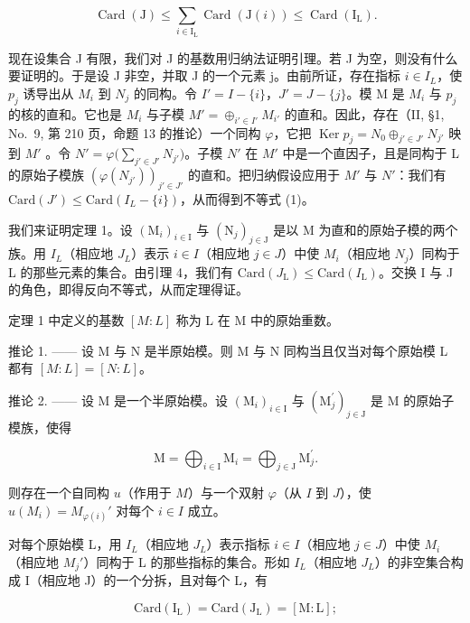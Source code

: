 \[
\operatorname{Card} (\mathrm{J}) \leqslant \sum_ {i \in \mathrm{I} _ {\mathrm{L}}} \operatorname{Card} (\mathrm{J} (i)) \leqslant \operatorname{Card} (\mathrm{I} _ {\mathrm{L}}).
\]

现在设集合 J 有限，我们对 J 的基数用归纳法证明引理。若 J 为空，则没有什么要证明的。于是设 J 非空，并取 J 的一个元素 j。由前所证，存在指标 \(i \in I_{L}\)，使 \(p_{j}\) 诱导出从 \(M_{i}\) 到 \(N_{j}\) 的同构。令 \(I' = I - \{i\}\)，\(J' = J - \{j\}\)。模 M 是 \(M_{i}\) 与 \(p_{j}\) 的核的直和。它也是 \(M_{i}\) 与子模 \(M' = \oplus_{i' \in I'} M_{i'}\) 的直和。因此，存在（II, §1, No.~9, 第 210 页，命题 13 的推论）一个同构 \(\varphi\)，它把 \(\operatorname{Ker} p_{j} = N_{0} \oplus_{j' \in J'} N_{j'}\) 映到 \(M'\) 。令 \(N' = \varphi\big(\sum_{j' \in J'} N_{j'}\big)\)。子模 \(N'\) 在 \(M'\) 中是一个直因子，且是同构于 L 的原始子模族 \((\varphi(N_{j'}))_{j' \in J'}\) 的直和。把归纳假设应用于 \(M'\) 与 \(N'\)：我们有 \(\text{Card}(J') \leqslant \text{Card}(I_L - \{i\})\)，从而得到不等式 (1)。

我们来证明定理 1。设 \((\mathrm{M}_{i})_{i\in\mathrm{I}}\) 与 \((\mathrm{N}_{j})_{j\in\mathrm{J}}\) 是以 M 为直和的原始子模的两个族。用 \(I_{L}\)（相应地 \(J_{L}\)）表示 \(i\in I\)（相应地 \(j\in J\)）中使 \(M_{i}\)（相应地 \(N_{j}\)）同构于 L 的那些元素的集合。由引理 4，我们有 \(\mathrm{Card}(J_{\mathrm{L}})\leqslant\mathrm{Card}(I_{\mathrm{L}})\)。交换 I 与 J 的角色，即得反向不等式，从而定理得证。

定理 1 中定义的基数 \([M : L]\) 称为 L 在 M 中的原始重数。

推论 1. —— 设 M 与 N 是半原始模。则 M 与 N 同构当且仅当对每个原始模 L 都有 \([M:L]=[N:L]\)。

推论 2. —— 设 M 是一个半原始模。设 \((\mathrm{M}_{i})_{i\in\mathrm{I}}\) 与 \((\mathrm{M}_{j}^{\prime})_{j\in\mathrm{J}}\) 是 M 的原始子模族，使得

\[
\mathrm{M} = \bigoplus_ {i \in \mathrm{I}} \mathrm{M} _ {i} = \bigoplus_ {j \in \mathrm{J}} \mathrm{M} _ {j} ^ {\prime}.
\]

则存在一个自同构 \(u\)（作用于 \(M\)）与一个双射 \(\varphi\)（从 \(I\) 到 \(J\)），使 \(u(M_i) = M_{\varphi(i)}'\) 对每个 \(i \in I\) 成立。

对每个原始模 L，用 \(I_{L}\)（相应地 \(J_{L}\)）表示指标 \(i \in I\)（相应地 \(j \in J\)）中使 \(M_{i}\)（相应地 \(M_{j}'\)）同构于 L 的那些指标的集合。形如 \(I_{L}\)（相应地 \(J_{L}\)）的非空集合构成 I（相应地 J）的一个分拆，且对每个 L，有

\[
\mathrm{Card} (\mathrm {I_ {L}}) = \mathrm{Card} (\mathrm {J_ {L}}) = [ \mathrm{M:L} ];
\]

